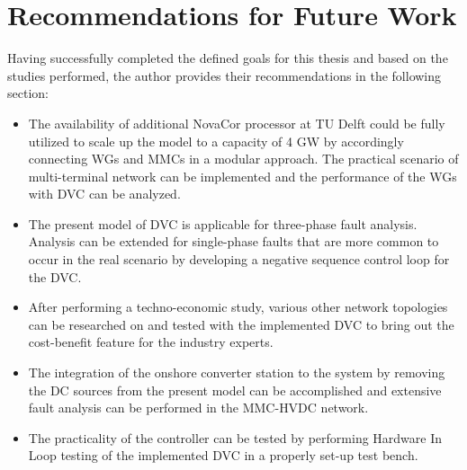 \section{Recommendations for Future Work}
Having successfully completed the defined goals for this thesis and based on the studies performed, the author provides their recommendations in the following section:  
\begin{itemize}
    \item The availability of additional NovaCor processor at TU Delft could be fully utilized to scale up the model to a capacity of 4 GW by accordingly connecting \gls{WG}s and \gls{MMC}s in a modular approach. The practical scenario of multi-terminal network can be implemented and the performance of the \gls{WG}s with \gls{DVC} can be analyzed.
    \item The present model of \gls{DVC} is applicable for three-phase fault analysis. Analysis can be extended for single-phase faults that are more common to occur in the real scenario by developing a negative sequence control loop for the \gls{DVC}.
    \item After performing a techno-economic study, various other network topologies can be researched on and tested with the implemented \gls{DVC} to bring out the cost-benefit feature for the industry experts. 
    \item The integration of the onshore converter station to the system by removing the \gls{DC} sources from the present model can be accomplished and extensive fault analysis can be performed in the \gls{MMC}-\gls{HVDC} network.
    \item The practicality of the controller can be tested by performing Hardware In Loop testing of the implemented \gls{DVC} in a properly set-up test bench.
\end{itemize}